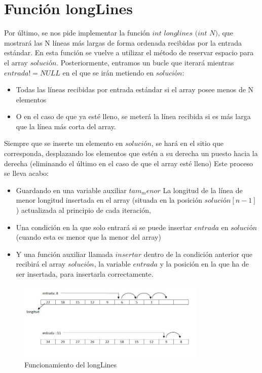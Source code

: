 \section{Función longLines}
Por último, se nos pide implementar la función $int$ $longlines$ $(int$ $N)$, que mostrará las N líneas más largas de forma ordenada recibidas por la entrada estándar.
En esta función se vuelve a utilizar el método de reservar espacio para el array $solución$. Posteriormente, entramos un bucle que iterará mientras $entrada != NULL$ en el que se irán metiendo en $solución$:
\begin{itemize}
\item Todas las líneas recibidas por entrada estándar si el array posee menos de N elementos
\item O en el caso de que ya esté lleno, se meterá la línea recibida si es más larga que la línea más corta del array.
\end{itemize}
Siempre que se inserte un elemento en $solución$, se hará en el sitio que corresponda, desplazando los elementos que estén a su derecha un puesto hacia la derecha (eliminando el último en el caso de que el array esté lleno)
Este proceso se lleva acabo:
\begin{itemize}
\item Guardando en una variable auxiliar $tam_menor$ La longitud de la línea de menor longitud insertada en el array (situada en la posición $solución[n-1]$) actualizada al principio de cada iteración,
\item Una condición en la que solo entrará si se puede insertar $entrada$ en $solución$ (cuando esta es menor que la menor del array)
\item Y una función auxiliar llamada $insertar$ dentro de la condición anterior que recibirá el array $solución$, la variable $entrada$ y la posición en la que ha de ser insertada, para insertarla correctamente.
\end{itemize}
\begin{figure}[htb]
\begin{center}
\centering
  \includegraphics[width=0.8\textwidth]{./img_2}
  \caption{Funcionamiento del longLines}
  \label{fig:Funcionamiento del longLines}
\end{center}
\end{figure} 

